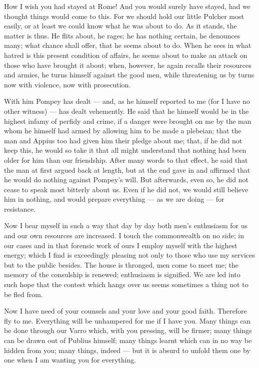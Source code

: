 

 How I wish you had stayed at Rome! And you would surely have stayed, had we thought things would come to this. For we should hold our little Pulcher most easily, or at least we could know what he was about to do. As it stands, the matter is thus. He flits about, he rages; he has nothing certain, he denounces many; what chance shall offer, that he seems about to do. When he sees in what hatred is this present condition of affairs, he seems about to make an attack on those who have brought it about; when, however, he again recalls their resources and armies, he turns himself against the good men, while threatening us by turns now with violence, now with prosecution.

 With him Pompey has dealt --- and, as he himself reported to me (for I have no other witness) --- has dealt vehemently. He said that he himself would be in the highest infamy of perfidy and crime, if a danger were brought on me by the man whom he himself had armed by allowing him to be made a plebeian; that the man and Appius too had given him their pledge about me; that, if he did not keep this, he would so take it that all might understand that nothing had been older for him than our friendship. After many words to that effect, he said that the man at first argued back at length, but at the end gave in and affirmed that he would do nothing against Pompey's will. But afterwards, even so, he did not cease to speak most bitterly about us. Even if he did not, we would still believe him in nothing, and would prepare everything --- as we are doing --- for resistance.

 Now I bear myself in such a way that day by day both men's enthusiasm for us and our own resources are increased. I touch the commonwealth on no side; in our cases and in that forensic work of ours I employ myself with the highest energy; which I find is exceedingly pleasing not only to those who use my services but to the public besides. The house is thronged, men come to meet me; the memory of the consulship is renewed; enthusiasm is signified. We are led into such hope that the contest which hangs over us seems sometimes a thing not to be fled from.

 Now I have need of your counsels and your love and your good faith. Therefore fly to me. Everything will be unhampered for me if I have you. Many things can be done through our Varro which, with you pressing, will be firmer; many things can be drawn out of Publius himself; many things learnt which can in no way be hidden from you; many things, indeed --- but it is absurd to unfold them one by one when I am wanting you for everything.

